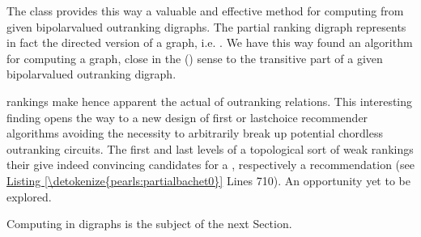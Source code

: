 \documentclass[a4paper,12pt,english]{sphinxhowto}
\begin{document}
\sphinxAtStartPar
The  class provides this way a valuable and effective method for computing  from given bipolar\sphinxhyphen{}valued outranking digraphs. The partial  ranking digraph represents in fact the directed version of a  graph, i.e.  . We have this way found an algorithm for computing a  graph, close in the {\hyperref[\detokenize{pearls:ordinalcorrelation-tutorial-label}]{}} () sense to the transitive part of a given bipolar\sphinxhyphen{}valued outranking digraph.

\begin{sphinxVerbatim}[commandchars=\\\{\},numbers=left,firstnumber=1,stepnumber=1]
  
\end{sphinxVerbatim}

\sphinxAtStartPar
{} rankings make hence apparent the actual  of outranking relations. This interesting finding opens the way to a new design of first\sphinxhyphen{} or last\sphinxhyphen{}choice recommender algorithms avoiding the necessity to arbitrarily break up potential chordless outranking circuits. The first and last levels of a topological sort of weak rankings \textendash{}their \textendash{} give indeed convincing candidates for a , respectively a  recommendation (see \hyperref[\detokenize{pearls:partialbachet0}]{Listing \ref{\detokenize{pearls:partialbachet0}}} Lines 7\sphinxhyphen{}10). An opportunity yet to be explored.

\sphinxAtStartPar
Computing  in digraphs is the subject of the next Section.
\end{document}
